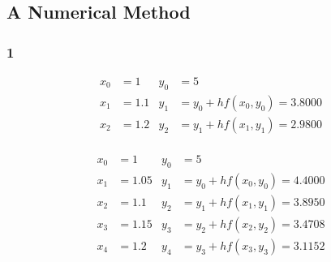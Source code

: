 \documentclass{article}
\begin{document}
\subsection{A Numerical Method}

\subsubsection{1}

\begin{align*}
  x_0 & = 1   & y_0 & = 5                            \\
  x_1 & = 1.1 & y_1 & = y_0 + h f(x_0, y_0) = 3.8000 \\
  x_2 & = 1.2 & y_2 & = y_1 + h f(x_1, y_1) = 2.9800 \\
\end{align*}

\begin{align*}
  x_0 & = 1    & y_0 & = 5                            \\
  x_1 & = 1.05 & y_1 & = y_0 + h f(x_0, y_0) = 4.4000 \\
  x_2 & = 1.1  & y_2 & = y_1 + h f(x_1, y_1) = 3.8950 \\
  x_3 & = 1.15 & y_3 & = y_2 + h f(x_2, y_2) = 3.4708 \\
  x_4 & = 1.2  & y_4 & = y_3 + h f(x_3, y_3) = 3.1152
\end{align*}
\end{document}
